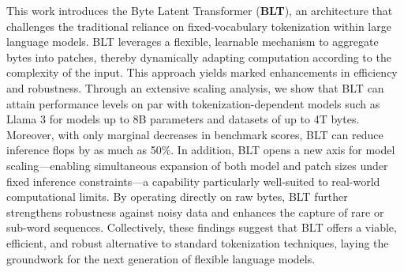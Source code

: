 This work introduces the Byte Latent Transformer (\textbf{BLT}), an architecture that challenges the traditional reliance on fixed-vocabulary tokenization within large language models. \textsc{BLT} leverages a flexible, learnable mechanism to aggregate bytes into patches, thereby dynamically adapting computation according to the complexity of the input. This approach yields marked enhancements in efficiency and robustness. Through an extensive scaling analysis, we show that \textsc{BLT} can attain performance levels on par with tokenization-dependent models such as Llama 3 for models up to 8B parameters and datasets of up to 4T bytes. Moreover, with only marginal decreases in benchmark scores, \textsc{BLT} can reduce inference flops by as much as 50\%. In addition, \textsc{BLT} opens a new axis for model scaling—enabling simultaneous expansion of both model and patch sizes under fixed inference constraints—a capability particularly well-suited to real-world computational limits. By operating directly on raw bytes, \textsc{BLT} further strengthens robustness against noisy data and enhances the capture of rare or sub-word sequences. Collectively, these findings suggest that \textsc{BLT} offers a viable, efficient, and robust alternative to standard tokenization techniques, laying the groundwork for the next generation of flexible language models.

